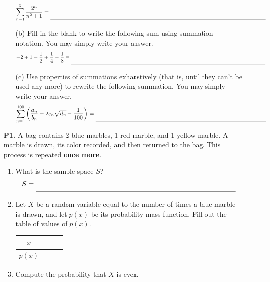 \documentclass[11pt]{article}
\begin{document}
\begin{enumerate}
\begin{enumerate}
\[\sum_{n=1}^{5} \frac{2^n}{n^2+1} = \rule[-10pt]{5.25in}{0.4pt} \]

    \vfill

\item[(b)] Fill in the blank to write the following sum using summation notation. You may simply write your answer.\\

{%
\[-2 + 1 - \frac{1}{2} + \frac{1}{4} - \frac{1}{8} = \rule[-10pt]{5in}{0.4pt}\]
}

    \vfill

\item[(c)] Use properties of summations exhaustively (that is, until they can't be used any more) to rewrite the following summation. You may simply write your answer.\\

{%
\[ \sum_{n=1}^{100}\left(\frac{a_n}{b_n} - 2c_n\sqrt{d_n} - \frac{1}{100} \right) = \rule[-10pt]{4in}{0.4pt}\]
}

    \vfill

\end{enumerate}
\newpage

\item[\textbf{P1.}]
A bag contains 2 blue marbles, 1 red marble, and 1 yellow marble.
A marble is drawn, its color recorded, and then returned to the bag.
This process is repeated \textbf{once more}.

\begin{enumerate}
\item
What is the sample space $S$?
{\Large
\[
S = \rule[-8pt]{4in}{0.4pt}
\]
}

\item
Let $X$ be a random variable equal to the
number of times a blue marble is drawn,
and let $p(x)$ be its probability mass function.
Fill out the table of values of $p(x)$.

\vspace{0.5cm}

\begin{minipage}{0.45\textwidth}
\centering    
\begin{tabular}{|c|ccc|}
    \hline
   $x$  & & &  \\
   \hline
   $p(x)$  & & \hphantom{123123123} &\\
   \hline
\end{tabular}
\end{minipage}
\vspace{.5in}
\item
Compute the probability that $X$ is even.
\vfill


\end{enumerate}
\end{enumerate}
\end{document}
